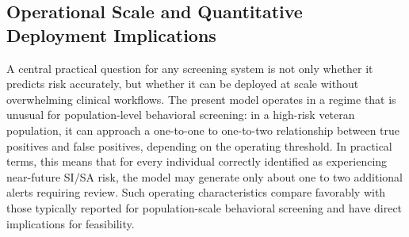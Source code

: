 \documentclass[onecolumn, compsoc,11pt]{IEEEtran}
\begin{document}
\subsection*{Operational Scale and Quantitative Deployment Implications}

A central practical question for any screening system is not only whether it predicts risk accurately, but whether it can be deployed at scale without overwhelming clinical workflows. The present model operates in a regime that is unusual for population-level behavioral screening: in a high-risk veteran population, it can approach a one-to-one to one-to-two relationship between true positives and false positives, depending on the operating threshold. In practical terms, this means that for every individual correctly identified as experiencing near-future SI/SA risk, the model may generate only about one to two additional alerts requiring review. Such operating characteristics compare favorably with those typically reported for population-scale behavioral screening and have direct implications for feasibility.
\end{document}
